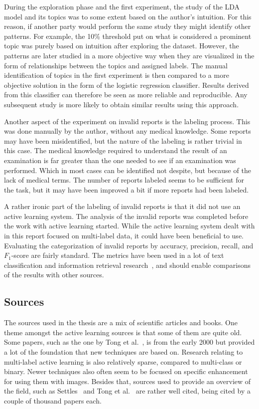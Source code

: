 During the exploration phase and the first experiment, the study of the LDA model and its topics was to some extent based on the author's intuition.
For this reason, if another party would perform the same study they might identify other patterns.
For example, the 10\% threshold put on what is considered a prominent topic was purely based on intuition after exploring the dataset.
However, the patterns are later studied in a more objective way when they are visualized in the form of relationships between the topics and assigned labels.
The manual identification of topics in the first experiment is then compared to a more objective solution in the form of the logistic regression classifier.
Results derived from this classifier can therefore be seen as more reliable and reproducible.
Any subsequent study is more likely to obtain similar results using this approach.

Another aspect of the experiment on invalid reports is the labeling process.
This was done manually by the author, without any medical knowledge.
Some reports may have been misidentified, but the nature of the labeling is rather trivial in this case.
The medical knowledge required to understand the result of an examination is far greater than the one needed to see if an examination was performed.
Which in most cases can be identified not despite, but because of the lack of medical terms.
The number of reports labeled seems to be sufficient for the task, but it may have been improved a bit if more reports had been labeled.

A rather ironic part of the labeling of invalid reports is that it did not use an active learning system.
The analysis of the invalid reports was completed before the work with active learning started.
While the active learning system dealt with in this report focused on multi-label data, it could have been beneficial to use.
Evaluating the categorization of invalid reports by accuracy, precision, recall, and $F_1$-score are fairly standard.
The metrics have been used in a lot of text classification and information retrieval research~\cite{aggarwal2012surveyclass, bishop2006pattern}, and should enable comparisons of the results with other sources.

\subsection{Sources}

The sources used in the thesis are a mix of scientific articles and books.
One theme amongst the active learning sources is that some of them are quite old.
Some papers, such as the one by Tong et al.~\cite{tong2001support}, is from the early 2000 but provided a lot of the foundation that new techniques are based on.
Research relating to multi-label active learning is also relatively sparse, compared to multi-class or binary.
Newer techniques also often seem to be focused on specific enhancement for using them with images.
Besides that, sources used to provide an overview of the field, such as Settles~\cite{settles2012active} and Tong et al\@.~\cite{tong2001active} are rather well cited, being cited by a couple of thousand papers each.


